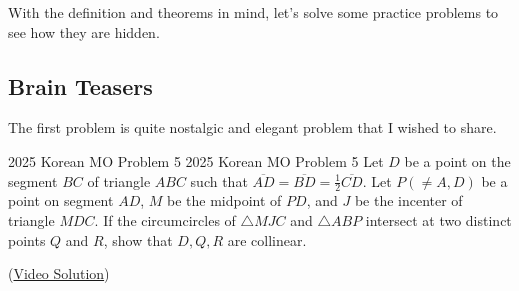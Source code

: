 \documentclass[../../../main.tex]{subfiles}
\begin{document}
With the definition and theorems in mind, let's solve some practice
problems to see how they are hidden.

\subsection{Brain Teasers}

The first problem is quite nostalgic and elegant problem that I
wished to share.

\begin{problem}
{2025 Korean MO Problem 5 \easy}
{2025 Korean MO Problem 5}
Let $D$ be a point on the segment $BC$ of triangle $ABC$ such that
$\overline{AD} = \overline{BD} = \frac{1}{2} \overline{CD}$. Let
$P (\neq A, D)$ be a point on segment $AD$, $M$ be the midpoint
of $PD$, and $J$ be the incenter of triangle $MDC$. If the
circumcircles of $\triangle{MJC}$ and $\triangle{ABP}$ intersect
at two distinct points $Q$ and $R$, show that $D, Q, R$ are collinear.
\end{problem}
(\href{https://youtu.be/BwEyAtgzZEE}{Video Solution})
\end{document}
